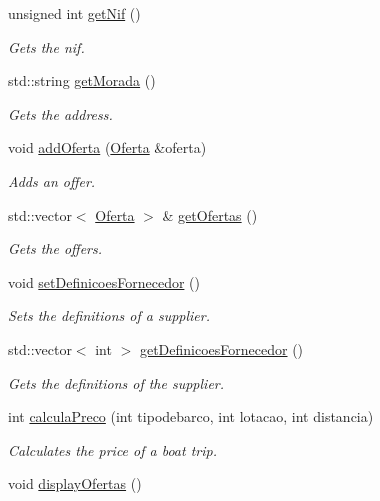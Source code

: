 \begin{DoxyCompactItemize}
unsigned int \hyperlink{classFornecedor_aec536b071f628fc1aa468071fa5a6067}{get\+Nif} ()
\begin{DoxyCompactList}\small\item\em Gets the nif. \end{DoxyCompactList}\item 
std\+::string \hyperlink{classFornecedor_ae71fba3a196f749f54956fdbb25ede6a}{get\+Morada} ()
\begin{DoxyCompactList}\small\item\em Gets the address. \end{DoxyCompactList}\item 
void \hyperlink{classFornecedor_a220373fd19f44a30d7c6c1ec913be700}{add\+Oferta} (\hyperlink{classOferta}{Oferta} \&oferta)
\begin{DoxyCompactList}\small\item\em Adds an offer. \end{DoxyCompactList}\item 
std\+::vector$<$ \hyperlink{classOferta}{Oferta} $>$ \& \hyperlink{classFornecedor_a7ef7f5f79e2c61aaca5d60c06b2a0051}{get\+Ofertas} ()
\begin{DoxyCompactList}\small\item\em Gets the offers. \end{DoxyCompactList}\item 
void \hyperlink{classFornecedor_a0a0945cbd2fd120d9eab5d5aec441b72}{set\+Definicoes\+Fornecedor} ()
\begin{DoxyCompactList}\small\item\em Sets the definitions of a supplier. \end{DoxyCompactList}\item 
std\+::vector$<$ int $>$ \hyperlink{classFornecedor_a94de4f30aa8328ce58dc1a8ec18e24c2}{get\+Definicoes\+Fornecedor} ()
\begin{DoxyCompactList}\small\item\em Gets the definitions of the supplier. \end{DoxyCompactList}\item 
int \hyperlink{classFornecedor_a977992e1dd6370a599e730d9883be277}{calcula\+Preco} (int tipodebarco, int lotacao, int distancia)
\begin{DoxyCompactList}\small\item\em Calculates the price of a boat trip. \end{DoxyCompactList}\item 
void \hyperlink{classFornecedor_a858875f921d2eebb652c4b7628f95c71}{display\+Ofertas} ()

\end{DoxyCompactItemize}
